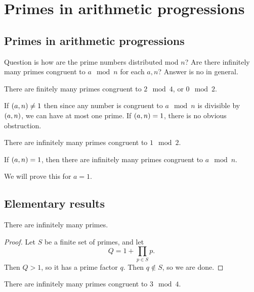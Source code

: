 \pagebreak

\section{Primes in arithmetic progressions}

\subsection{Primes in arithmetic progressions}

Question is how are the prime numbers distributed mod $ n $? Are there infinitely many primes congruent to $ a \mod n $ for each $ a, n $? Answer is no in general.

\begin{example2}
There are finitely many primes congruent to $ 2 \mod 4 $, or $ 0 \mod 2 $.
\end{example2}

If $ \left( a, n \right) \ne 1 $ then since any number is congruent to $ a \mod n $ is divisible by $ \left( a, n \right) $, we can have at most one prime. If $ \left( a, n \right) = 1 $, there is no obvious obstruction.

\begin{example2}
There are infinitely many primes congruent to $ 1 \mod 2 $.
\end{example2}

\begin{theorem}
If $ \left( a, n \right) = 1 $, then there are infinitely many primes congruent to $ a \mod n $.
\end{theorem}

We will prove this for $ a = 1 $.

\subsection{Elementary results}

\begin{theorem}
There are infinitely many primes.
\end{theorem}

\begin{proof}
Let $ S $ be a finite set of primes, and let
$$ Q = 1 + \prod_{p \in S} p. $$
Then $ Q > 1 $, so it has a prime factor $ q $. Then $ q \notin S $, so we are done.
\end{proof}

\begin{theorem}
There are infinitely many primes congruent to $ 3 \mod 4 $.
\end{theorem}

